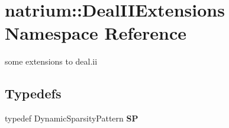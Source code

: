 \hypertarget{namespacenatrium_1_1DealIIExtensions}{
\section{natrium::DealIIExtensions Namespace Reference}
\label{namespacenatrium_1_1DealIIExtensions}
}


some extensions to deal.ii  
\subsection*{Typedefs}
\begin{DoxyCompactItemize}
\item 
\hypertarget{namespacenatrium_1_1DealIIExtensions_a2d320098833f9b096e93d4c565675338}{
typedef DynamicSparsityPattern {\bfseries SP}}
\label{namespacenatrium_1_1DealIIExtensions_a2d320098833f9b096e93d4c565675338}

\end{DoxyCompactItemize}
